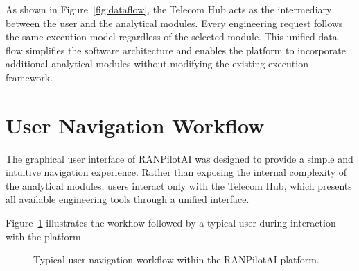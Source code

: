 As shown in Figure~\ref{fig:dataflow}, the Telecom Hub acts as the intermediary between the user and the analytical modules. Every engineering request follows the same execution model regardless of the selected module. This unified data flow simplifies the software architecture and enables the platform to incorporate additional analytical modules without modifying the existing execution framework.

\section{User Navigation Workflow}

The graphical user interface of RANPilotAI was designed to provide a simple and intuitive navigation experience. Rather than exposing the internal complexity of the analytical modules, users interact only with the Telecom Hub, which presents all available engineering tools through a unified interface.

Figure~\ref{fig:activity} illustrates the workflow followed by a typical user during interaction with the platform.


\begin{figure}[H]
\centering


\caption{Typical user navigation workflow within the RANPilotAI platform.}

\label{fig:activity}

\end{figure}

